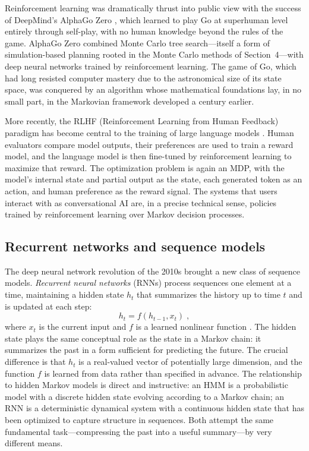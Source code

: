 \medskip

Reinforcement learning was dramatically thrust into public view with the success of DeepMind's AlphaGo Zero \cite{silver_2017_mastering}, which learned to play Go at superhuman level entirely through self-play, with no human knowledge beyond the rules of the game. AlphaGo Zero combined Monte Carlo tree search---itself a form of simulation-based planning rooted in the Monte Carlo methods of Section~4---with deep neural networks trained by reinforcement learning. The game of Go, which had long resisted computer mastery due to the astronomical size of its state space, was conquered by an algorithm whose mathematical foundations lay, in no small part, in the Markovian framework developed a century earlier.

\medskip

More recently, the RLHF (Reinforcement Learning from Human Feedback) paradigm has become central to the training of large language models \cite{brown_2020_language,ouyang_2022_training}. Human evaluators compare model outputs, their preferences are used to train a reward model, and the language model is then fine-tuned by reinforcement learning to maximize that reward. The optimization problem is again an MDP, with the model's internal state and partial output as the state, each generated token as an action, and human preference as the reward signal. The systems that users interact with as conversational AI are, in a precise technical sense, policies trained by reinforcement learning over Markov decision processes.

\subsection{Recurrent networks and sequence models}

The deep neural network revolution of the 2010s brought a new class of sequence models. \textit{Recurrent neural networks} (RNNs) process sequences one element at a time, maintaining a hidden state $h_t$ that summarizes the history up to time $t$ and is updated at each step:
\begin{equation}
    h_t = f(h_{t-1}, x_t) \; ,
\end{equation}
where $x_t$ is the current input and $f$ is a learned nonlinear function \cite{rumelhart_1986_learning}. The hidden state plays the same conceptual role as the state in a Markov chain: it summarizes the past in a form sufficient for predicting the future. The crucial difference is that $h_t$ is a real-valued vector of potentially large dimension, and the function $f$ is learned from data rather than specified in advance. The relationship to hidden Markov models is direct and instructive: an HMM is a probabilistic model with a discrete hidden state evolving according to a Markov chain; an RNN is a deterministic dynamical system with a continuous hidden state that has been optimized to capture structure in sequences. Both attempt the same fundamental task---compressing the past into a useful summary---by very different means.

